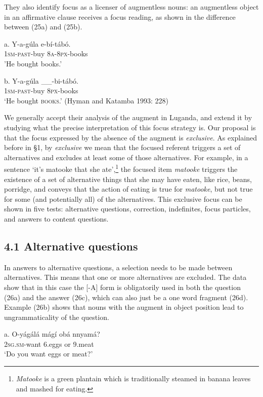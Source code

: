\documentclass[output=paper]{langsci/langscibook}
\begin{document}
They also identify focus as a licenser of augmentless nouns: an augmentless object in an affirmative clause receives a focus reading, as shown in the difference between (25a) and (25b).

\ea
\gll a.  Y-a-gúla    e-bí-tábó.\\
       \textsc{1sm}{}-\textsc{past}{}-buy  \textsc{8a}{}-\textsc{8px}{}-books\\
\glt   'He bought books.'
\z

\ea
\gll b.  Y-a-gúla    \_\_-bi-tábó.\\
       \textsc{1sm}{}-\textsc{past}{}-buy       \textsc{8px}{}-books\\
\glt   ‘He bought \textsc{books}.’ (Hyman and Katamba 1993: 228)
\z

We generally accept their analysis of the augment in Luganda, and extend it by studying what the precise interpretation of this focus strategy is. Our proposal is that the focus expressed by the absence of the augment is \textit{exclusive}. As explained before in §1, by \textit{exclusive} we mean that the focused referent triggers a set of alternatives and excludes at least some of those alternatives. For example, in a sentence ‘it’s matooke that she ate’,\footnote{ \textit{Matooke} is a green plantain which is traditionally steamed in banana leaves and mashed for eating.  }{ }the focused item \textit{matooke} triggers the existence of a set of alternative things that she may have eaten, like rice, beans, porridge, and conveys that the action of eating is true for \textit{matooke}, but not true for some (and potentially all) of the alternatives. This exclusive focus can be shown in five tests: alternative questions, correction, indefinites, focus particles, and answers to content questions.

\subsection{4.1 Alternative questions}

In answers to alternative questions, a selection needs to be made between alternatives. This means that one or more alternatives are excluded. The data show that in this case the [-A] form is obligatorily used in both the question (26a) and the answer (26c), which can also just be a one word fragment (26d). Example (26b) shows that nouns with the augment in object position lead to ungrammaticality of the question. 

\ea
\gll   a.  O-yágálá    mágí    obá  nnyamá?\\
         \textsc{2sg}.\textsc{sm}{}-want    6.eggs    or  9.meat \\
\glt     ‘Do you want eggs or meat?’
\z
\end{document}
